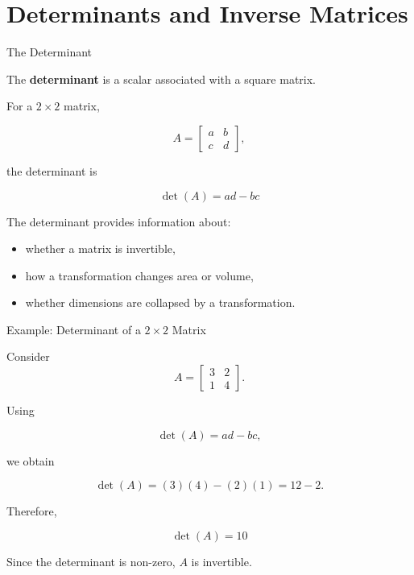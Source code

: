 

\section{Determinants and Inverse Matrices}


\begin{frame}{The Determinant}

The \textbf{determinant} is a scalar associated with a
square matrix.

For a $2\times2$ matrix,

\[
A=
\begin{bmatrix}
a&b\\
c&d
\end{bmatrix},
\]

the determinant is

\[
\boxed{
\det(A)=ad-bc
}
\]

\vspace{0.4cm}

The determinant provides information about:

\begin{itemize}
    \item whether a matrix is invertible,
    \item how a transformation changes area or volume,
    \item whether dimensions are collapsed by a transformation.
\end{itemize}

\end{frame}



\begin{frame}{Example: Determinant of a $2\times2$ Matrix}

Consider
\vspace{-0.1cm}
\[
A=
\begin{bmatrix}
3&2\\
1&4
\end{bmatrix}.
\]

Using

\[
\det(A)=ad-bc,
\]

we obtain

\[
\det(A)
=
(3)(4)-(2)(1)
=
12-2.
\]

Therefore,

\[
\boxed{
\det(A)=10
}
\]

Since the determinant is non-zero, $A$ is invertible.

\end{frame}


